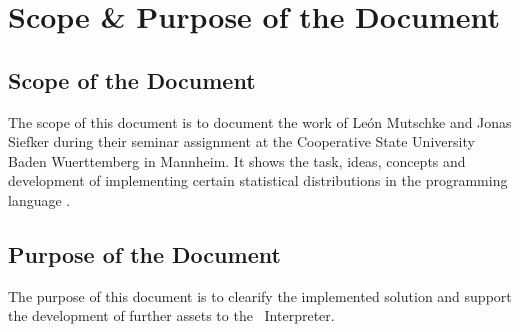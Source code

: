 

\chapter*{Scope \& Purpose of the Document}

\section*{Scope of the Document}
	The scope of this document is to document the work of Le\'{o}n Mutschke and Jonas Siefker during their seminar assignment at the Cooperative State University Baden Wuerttemberg in Mannheim. It shows the task, ideas, concepts and development of implementing certain statistical distributions in the programming language \setlx.

\section*{Purpose of the Document}
	The purpose of this document is to clearify the implemented solution and support the development of further assets to the \setlx\ Interpreter.
